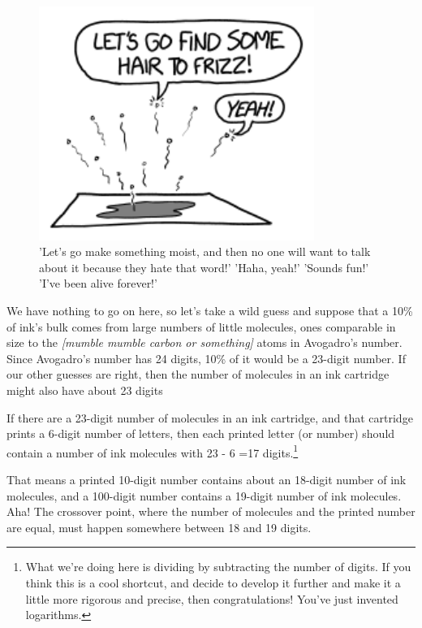 {\begin{figure}[!htbp]
\centering
\includegraphics[scale=0.5, max width=0.8\textwidth]{imgs/a/106/drying.png}
\caption{'Let's go make something moist, and then no one will want to talk about it because they hate that word!' 'Haha, yeah!' 'Sounds fun!' 'I've been alive forever!'}
\end{figure}

{We have nothing to go on here, so let's take a wild guess and suppose that a 10\% of ink's bulk comes from large numbers of little molecules, ones comparable in size to the \emph{[mumble mumble carbon or something]} atoms in Avogadro's number. Since Avogadro's number has 24 digits, 10\% of it would be a 23-digit number. If our other guesses are right, then the number of molecules in an ink cartridge might also have about 23 digits}

{If there are a 23-digit number of molecules in an ink cartridge, and that cartridge prints a 6-digit number of letters, then each printed letter (or number) should contain a number of ink molecules with 23 - 6 =17 digits.{\footnote{What we're doing here is dividing by subtracting the number of digits. If you think this is a cool shortcut, and decide to develop it further and make it a little more rigorous and precise, then congratulations! You've just invented logarithms.} } }

{That means a printed 10-digit number contains about an 18-digit number of ink molecules, and a 100-digit number contains a 19-digit number of ink molecules. Aha! The crossover point, where the number of molecules and the printed number are equal, must happen somewhere between 18 and 19 digits.}

}
